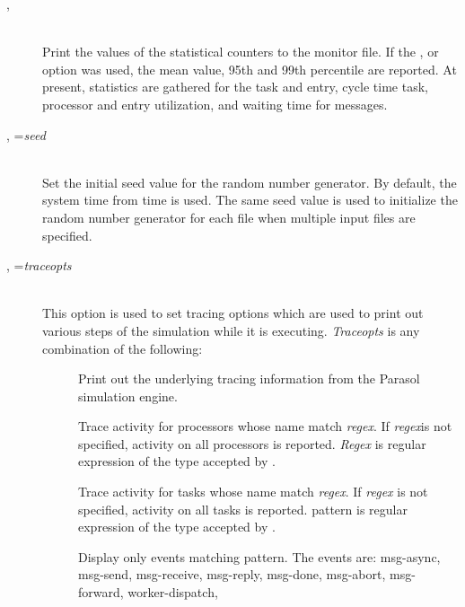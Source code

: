 \begin{description}
\item[, ]~\\
  Print the values of the statistical
  counters to
  the monitor file.  If the , 
  or  option was used, the mean value, 95th and 99th
  percentile are reported.  At present, statistics are gathered for
  the task and entry,
  cycle time task,
  processor and
  entry utilization, and waiting
  time for messages.
\item[, =\emph{seed}]~\\
  Set the initial seed value for the random
  number generator.  By default, the
  system time from time  is used.  The same seed
  value is used to initialize the random number generator for each
  file when multiple input files are specified.
\item[, =\emph{traceopts}]~\\
  This option is used to set tracing options which are
  used to print out various steps of the simulation while it is
  executing.  \emph{Traceopts} is any combination of the following:
  \begin{description}
  \item[] Print out the underlying tracing
    information from the Parasol simulation engine.
  \item[] Trace activity for
    processors whose
    name match \emph{regex}.  If \emph{regex}is not specified,
    activity on all processors is reported.  \emph{Regex} is regular
    expression of the type accepted by .
  \item[] Trace activity for
    tasks whose name match
    \emph{regex}.  If \emph{regex} is not specified, activity on all
    tasks is reported.  pattern is regular expression of the type
    accepted by .
  \item[] Display only events matching
    pattern.  The events are: msg-async, msg-send, msg-receive,
    msg-reply, msg-done, msg-abort, msg-forward, worker-dispatch,

\end{description}
\end{description}
